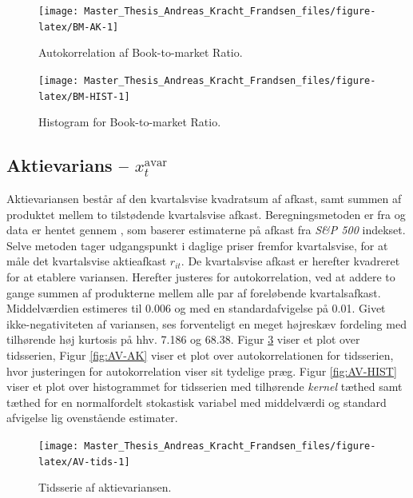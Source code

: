 \documentclass[
  a4paper,
  oneside]{memoir}
\begin{document}
\begin{figure}[H]

{\centering \texttt{[image: Master\_Thesis\_Andreas\_Kracht\_Frandsen\_files/figure-latex/BM-AK-1]} 

}

\caption{Autokorrelation af Book-to-market Ratio.}\label{fig:BM-AK}
\end{figure}

\begin{figure}[H]

{\centering \texttt{[image: Master\_Thesis\_Andreas\_Kracht\_Frandsen\_files/figure-latex/BM-HIST-1]} 

}

\caption{Histogram for Book-to-market Ratio.}\label{fig:BM-HIST}
\end{figure}

\hypertarget{aktievarians-x_ttextavar}{%
\subsection{\texorpdfstring{Aktievarians -- \(x_t^{\text{avar}}\)}{Aktievarians -- x\_t\^{}\{\textbackslash text\{avar\}\}}}\label{aktievarians-x_ttextavar}}

Aktievariansen består af den kvartalsvise kvadratsum af afkast, samt summen af produktet mellem to tilstødende kvartalsvise afkast. Beregningsmetoden er fra \citep{Schwert1987} og data er hentet gennem \citep{Goyal2007}, som baserer estimaterne på afkast fra \emph{S\&P 500} indekset. Selve metoden tager udgangspunkt i daglige priser fremfor kvartalsvise, for at måle det kvartalsvise aktieafkast \(r_{it}\). De kvartalsvise afkast er herefter kvadreret for at etablere variansen. Herefter justeres for autokorrelation, ved at addere to gange summen af produkterne mellem alle par af foreløbende kvartalsafkast. Middelværdien estimeres til 0.006 og med en standardafvigelse på 0.01. Givet ikke-negativiteten af variansen, ses forventeligt en meget højreskæv fordeling med tilhørende høj kurtosis på hhv. 7.186 og 68.38. Figur \ref{fig:AV-tids} viser et plot over tidsserien, Figur \ref{fig:AV-AK} viser et plot over autokorrelationen for tidsserien, hvor justeringen for autokorrelation viser sit tydelige præg. Figur \ref{fig:AV-HIST} viser et plot over histogrammet for tidsserien med tilhørende \emph{kernel} tæthed samt tæthed for en normalfordelt stokastisk variabel med middelværdi og standard afvigelse lig ovenstående estimater.

\begin{figure}[H]

{\centering \texttt{[image: Master\_Thesis\_Andreas\_Kracht\_Frandsen\_files/figure-latex/AV-tids-1]} 

}

\caption{Tidsserie af aktievariansen.}\label{fig:AV-tids}
\end{figure}
\end{document}
